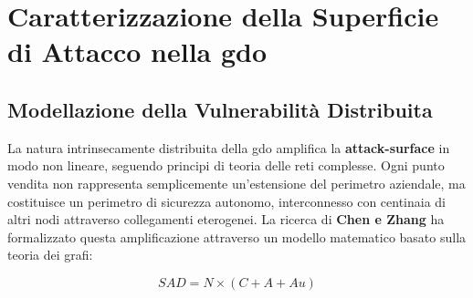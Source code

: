 
\section{\texorpdfstring{Caratterizzazione della Superficie di Attacco nella \gls{gdo}}{2.2 - Caratterizzazione della Superficie di Attacco nella GDO}}

\subsection{\texorpdfstring{Modellazione della Vulnerabilità Distribuita}{2.2.1 - Modellazione della Vulnerabilità Distribuita}}

La natura intrinsecamente distribuita della \gls{gdo} amplifica la \textbf{\gls{attack-surface}} in modo non lineare, seguendo principi di teoria delle reti complesse. Ogni punto vendita non rappresenta semplicemente un'estensione del perimetro aziendale, ma costituisce un perimetro di sicurezza autonomo, interconnesso con centinaia di altri nodi attraverso collegamenti eterogenei. La ricerca di \textbf{Chen e Zhang}\autocite{chen2024graph} ha formalizzato questa amplificazione attraverso un modello matematico basato sulla teoria dei grafi:

\begin{equation}
SAD = N \times (C + A + Au)
\end{equation}

